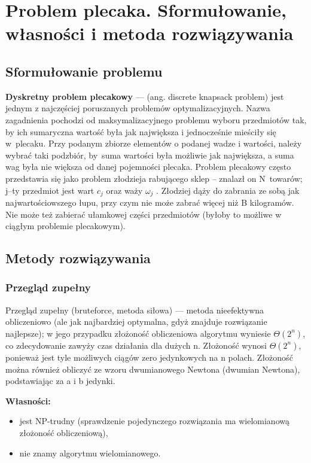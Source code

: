 \documentclass[10pt, a
4paper]{article}
\begin{document}
\newpage
\section{Problem plecaka. Sformułowanie, własności i metoda rozwiązywania}
\subsection{Sformułowanie problemu}
\noindent \textbf{Dyskretny problem plecakowy} --- (ang. discrete knapsack problem) jest jednym z najczęściej poruszanych problemów optymalizacyjnych. Nazwa zagadnienia pochodzi od maksymalizacyjnego problemu wyboru przedmiotów tak, by ich sumaryczna wartość była jak największa i jednocześnie mieściły się w~plecaku. Przy podanym zbiorze elementów o podanej wadze i wartości, należy wybrać taki podzbiór, by~suma wartości była możliwie jak największa, a suma wag była nie większa od danej pojemności plecaka. Problem plecakowy często przedstawia się jako problem złodzieja rabującego sklep – znalazł on N~towarów; j–ty przedmiot jest wart $c_{j}$ oraz waży $\omega_{j}$ . Złodziej dąży do zabrania ze sobą jak najwartościowszego łupu, przy czym nie może zabrać więcej niż B kilogramów. Nie może też zabierać ułamkowej części przedmiotów (byłoby to możliwe w ciągłym problemie plecakowym).

\subsection{Metody rozwiązywania}
\subsubsection{Przegląd zupełny}
Przegląd zupełny (bruteforce, metoda siłowa) --– metoda nieefektywna obliczeniowo (ale jak najbardziej optymalna, gdyż znajduje rozwiązanie najlepsze); w jego przypadku złożoność obliczeniowa algorytmu wyniesie $\Theta(2^{n})$, co zdecydowanie zawyży czas działania dla dużych n. Złożoność wynosi $\Theta(2^{n})$, ponieważ jest tyle możliwych ciągów zero jedynkowych na n polach. Złożoność można również obliczyć ze wzoru dwumianowego Newtona (dwumian Newtona), podstawiając za a i b jedynki.

\textbf{Własności:}
\begin{itemize}
\item jest NP-trudny (sprawdzenie pojedynczego rozwiązania ma wielomianową złożoność obliczeniową),
\item nie znamy algorytmu wielomianowego.

\end{itemize}
\end{document}
